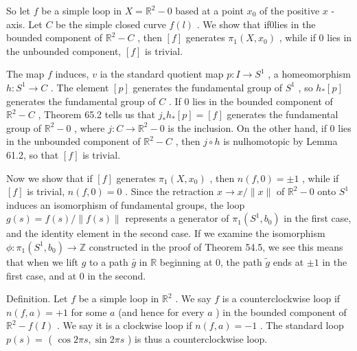 \documentclass[10pt]{article}
\begin{document}
So let \(f\) be a simple loop in \(X = {\mathbb{R}}^{2} - 0\) based at a point \({x}_{0}\) of the positive \(x\) - axis. Let \(C\) be the simple closed curve \(f\left( l\right)\) . We show that if0lies in the bounded component of \({\mathbb{R}}^{2} - C\) , then \(\left\lbrack  f\right\rbrack\) generates \({\pi }_{1}\left( {X,{x}_{0}}\right)\) , while if 0 lies in the unbounded component, \(\left\lbrack  f\right\rbrack\) is trivial.

The map \(f\) induces, \(v\) ia the standard quotient map \(p : I \rightarrow  {S}^{1}\) , a homeomorphism \(h : {S}^{1} \rightarrow  C\) . The element \(\left\lbrack  p\right\rbrack\) generates the fundamental group of \({S}^{1}\) , so \({h}_{ * }\left\lbrack  p\right\rbrack\) generates the fundamental group of \(C\) . If 0 lies in the bounded component of \({\mathbb{R}}^{2} - C\) , Theorem 65.2 tells us that \({j}_{ * }{h}_{ * }\left\lbrack  p\right\rbrack   = \left\lbrack  f\right\rbrack\) generates the fundamental group of \({\mathbb{R}}^{2} - 0\) , where \(j : C \rightarrow  {\mathbb{R}}^{2} - 0\) is the inclusion. On the other hand, if 0 lies in the unbounded component of \({\mathbb{R}}^{2} - C\) , then \(j \circ  h\) is nulhomotopic by Lemma 61.2, so that \(\left\lbrack  f\right\rbrack\) is trivial.

Now we show that if \(\left\lbrack  f\right\rbrack\) generates \({\pi }_{1}\left( {X,{x}_{0}}\right)\) , then \(n\left( {f,0}\right)  =  \pm  1\) , while if \(\left\lbrack  f\right\rbrack\) is trivial, \(n\left( {f,0}\right)  = 0\) . Since the retraction \(x \rightarrow  x/\parallel x\parallel\) of \({\mathbb{R}}^{2} - 0\) onto \({S}^{1}\) induces an isomorphism of fundamental groups, the loop \(g\left( s\right)  = f\left( s\right) /\parallel f\left( s\right) \parallel\) represents a generator of \({\pi }_{1}\left( {{S}^{1},{b}_{0}}\right)\) in the first case, and the identity element in the second case. If we examine the isomorphism \(\phi  : {\pi }_{1}\left( {{S}^{1},{b}_{0}}\right)  \rightarrow  \mathbb{Z}\) constructed in the proof of Theorem 54.5, we see this means that when we lift \(g\) to a path \(\bar{g}\) in \(\mathbb{R}\) beginning at 0, the path \(\widetilde{g}\) ends at \(\pm  1\) in the first case, and at 0 in the second.

Definition. Let \(f\) be a simple loop in \({\mathbb{R}}^{2}\) . We say \(f\) is a counterclockwise loop if \(n\left( {f,a}\right)  =  + 1\) for some \(a\) (and hence for every \(a\) ) in the bounded component of \({\mathbb{R}}^{2} - f\left( I\right)\) . We say it is a clockwise loop if \(n\left( {f,a}\right)  =  - 1\) . The standard loop \(p\left( s\right)  =\) ( \(\cos {2\pi s},\sin {2\pi s}\) ) is thus a counterclockwise loop.
\end{document}
